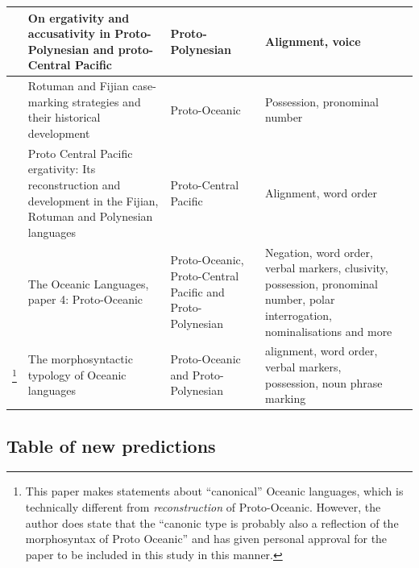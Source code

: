 \documentclass[a4paper,10pt]{article} %
\begin{document}
\begin{longtable}{|p{3cm}|  p{5cm}| p{4cm} | p{3cm}  | p{3cm} |}
\citet{ball2007ergativity} & On ergativity and accusativity in Proto-Polynesian and proto-Central Pacific&Proto-Polynesian & Alignment, voice \\ \hline

\citet{kikusawa2001rotuman} & Rotuman and Fijian case-marking strategies and their historical development  & Proto-Oceanic & Possession, pronominal number \\ \hline

\citet{kikusawa2002proto}  & Proto Central Pacific ergativity: Its reconstruction and development in the Fijian, Rotuman and Polynesian languages & Proto-Central Pacific   & Alignment, word order \\ \hline

\citet{lynchrosscrowley_proto_grammar_oceanic} & The Oceanic Languages, paper 4: Proto-Oceanic & Proto-Oceanic, Proto-Central Pacific and Proto-Polynesian & Negation, word order, verbal markers, clusivity, possession, pronominal number, polar interrogation, nominalisations and more \\ \hline

\citet{ross2004morphosyntactic}\footnote{This paper makes statements about ``canonical'' Oceanic languages, which is technically different from \emph{reconstruction} of Proto-Oceanic. However, the author does state that the ``canonic type is probably also a reflection of the morphosyntax of Proto Oceanic'' \citep[492]{ross2004morphosyntactic} and has given personal approval for the paper to be included in this study in this manner.}  & The morphosyntactic typology of Oceanic languages &  Proto-Oceanic and Proto-Polynesian  & alignment, word order, verbal markers, possession, noun phrase marking \\ \hline
\end{longtable}


\subsection{Table of new predictions}
\label{asr_table_extra}
\singlespacing
\begin{landscape}

\end{landscape}
\end{document}
